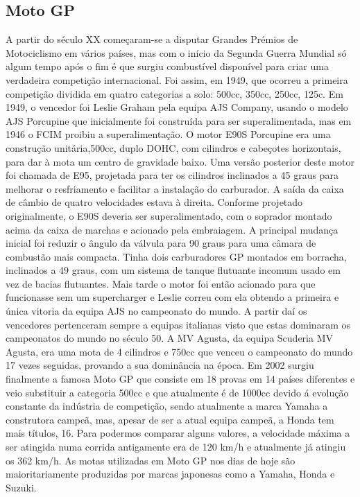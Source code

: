 \documentclass{report}
\begin{document}
\subsection{Moto GP}
A partir do século XX começaram-se a disputar Grandes Prémios de Motociclismo em vários países, mas com o início da Segunda Guerra Mundial só algum tempo após o fim é que surgiu combustível disponível para criar uma verdadeira competição internacional.
Foi assim, em 1949, que ocorreu a primeira competição dividida em quatro categorias a solo: 500cc, 350cc, 250cc, 125c. Em 1949, o vencedor foi Leslie Graham pela equipa AJS Company, usando o modelo AJS Porcupine que inicialmente foi construída para ser superalimentada, mas em 1946 o FCIM proibiu a superalimentação. O motor E90S Porcupine era uma construção unitária,500cc, duplo DOHC, com cilindros e cabeçotes horizontais, para dar à mota um centro de gravidade baixo. Uma versão posterior deste motor foi chamada de E95, projetada para ter os cilindros inclinados a 45 graus para melhorar o resfriamento e facilitar a instalação do carburador. A saída da caixa de câmbio de quatro velocidades estava à direita. Conforme projetado originalmente, o E90S deveria ser superalimentado, com o soprador montado acima da caixa de marchas e acionado pela embraiagem. A principal mudança inicial foi reduzir o ângulo da válvula para 90 graus para uma câmara de combustão mais compacta. Tinha dois carburadores GP montados em borracha, inclinados a 49 graus, com um sistema de tanque flutuante incomum usado em vez de bacias flutuantes. Mais tarde o motor foi então acionado para que funcionasse sem um supercharger e Leslie correu com ela obtendo a primeira e única vitoria da equipa AJS no campeonato do mundo.  A partir daí os vencedores pertenceram sempre a equipas italianas visto que estas dominaram os campeonatos do mundo no século 50. A MV Agusta, da equipa Scuderia MV Agusta, era uma mota de 4 cilindros e 750cc que venceu o campeonato do mundo 17 vezes seguidas, provando a sua dominância na época. Em 2002 surgiu finalmente a famosa Moto GP que consiste em 18 provas em 14 países diferentes e veio substituir a categoria 500cc e que atualmente é de 1000cc devido á evolução constante da indústria de competição, sendo atualmente a marca Yamaha a construtora campeã, mas, apesar de ser a atual equipa campeã, a Honda tem mais títulos, 16. Para podermos comparar alguns valores, a velocidade máxima a ser atingida numa corrida antigamente era de 120 km/h e atualmente já atingiu os 362 km/h. As motas utilizadas em Moto GP nos dias de hoje são maioritariamente produzidas por marcas japonesas como a Yamaha, Honda e Suzuki. 
\end{document}
